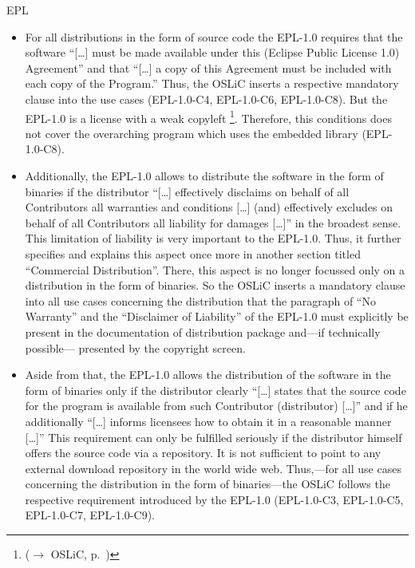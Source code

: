 \begin{license}{EPL}
\begin{itemize}
  \item For all distributions in the form of source code the EPL-1.0 requires that
    the software \enquote{[\ldots] must be made available under this (Eclipse
    Public License 1.0) Agreement} and that \enquote{[\ldots] a copy of this
    Agreement must be included with each copy of the Program.} 
    Thus, the OSLiC inserts a respective mandatory clause into the use cases
    (EPL-1.0-C4, EPL-1.0-C6, EPL-1.0-C8). But the EPL-1.0 is a license with a weak copyleft%
    \footnote{($\rightarrow$ OSLiC, p.\ )}. 
    Therefore, this conditions does not cover the overarching program which uses
    the embedded library (EPL-1.0-C8).
    
  \item Additionally, the EPL-1.0 allows to distribute the software in the form
    of binaries if the distributor \enquote{[\ldots] effectively disclaims on
    behalf of all Contributors all warranties and conditions [\ldots] (and)
    effectively excludes on behalf of all Contributors all liability for
    damages [\ldots]} in the broadest sense. This limitation of
    liability is very important to the EPL-1.0. Thus, it further specifies and
    explains this aspect once more in another section titled \enquote{Commercial
    Distribution}. There, this aspect is no longer focussed only on a
    distribution in the form of binaries. So the OSLiC inserts a
    mandatory clause into all use cases concerning the distribution that the
    paragraph of \enquote{No Warranty} and the \enquote{Disclaimer
    of Liability} of the EPL-1.0 must explicitly be present in the
    documentation of distribution package and---if technically possible---%
    presented by the copyright screen.   
  
  \item Aside from that, the EPL-1.0 allows the distribution of the software in the
    form of binaries only if the distributor clearly \enquote{[\ldots] states that
    the source code for the program is available from such Contributor
    (distributor) [\ldots]} and if he additionally \enquote{[\ldots] informs
    licensees how to obtain it in a reasonable manner [\ldots]} 
    This requirement can only be fulfilled seriously if the distributor himself
    offers the source code via a repository. It is not sufficient to point to
    any external download repository in the world wide web. Thus,---for all use
    cases concerning the distribution in the form of binaries---the OSLiC
    follows the respective requirement introduced by the EPL-1.0 (EPL-1.0-C3, EPL-1.0-C5,
    EPL-1.0-C7, EPL-1.0-C9).  
  

\end{itemize}
\end{license}
